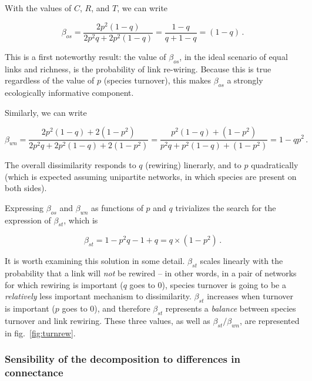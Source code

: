 \documentclass[10pt,oneside]{article}
\begin{document}
With the values of \(C\), \(R\), and \(T\), we can write

\[\beta_{os} = \frac{2p^2(1-q)}{2p^2q+2p^2(1-q)} = \frac{1-q}{q + 1 -q} =
(1-q)\,.\]

This is a first noteworthy result: the value of \(\beta_{os}\), in the
ideal scenario of equal links and richness, is the probability of link
re-wiring. Because this is true regardless of the value of \(p\)
(species turnover), this makes \(\beta_{os}\) a strongly ecologically
informative component.

Similarly, we can write

\[\beta_{wn} = \frac{2p^2(1-q)+2(1-p^2)}{2p^2q + 2p^2(1-q)+2(1-p^2)} = \frac{p^2(1-q)+(1-p^2)}{p^2q+p^2(1-q)+(1-p^2)} = 1-qp^2\,.\]

The overall dissimilarity responds to \(q\) (rewiring) linerarly, and to
\(p\) quadratically (which is expected assuming unipartite networks, in
which species are present on both sides).

Expressing \(\beta_{os}\) and \(\beta_{wn}\) as functions of \(p\) and
\(q\) trivializes the search for the expression of \(\beta_{st}\), which
is

\[\beta_{st} = 1 - p^2q - 1 + q = q\times(1-p^2)\,.\]

It is worth examining this solution in some detail. \(\beta_{st}\)
scales linearly with the probability that a link will \emph{not} be
rewired -- in other words, in a pair of networks for which rewiring is
important (\(q\) goes to 0), species turnover is going to be a
\emph{relatively} less important mechanism to dissimilarity.
\(\beta_{st}\) increases when turnover is important (\(p\) goes to 0),
and therefore \(\beta_{st}\) represents a \emph{balance} between species
turnover and link rewiring. These three values, as well as
\(\beta_{st}/\beta_{wn}\), are represented in fig.~\ref{fig:turnrew}.

\hypertarget{sensibility-of-the-decomposition-to-differences-in-connectance}{%
\subsubsection{Sensibility of the decomposition to differences in
connectance}\label{sensibility-of-the-decomposition-to-differences-in-connectance}}
\end{document}
